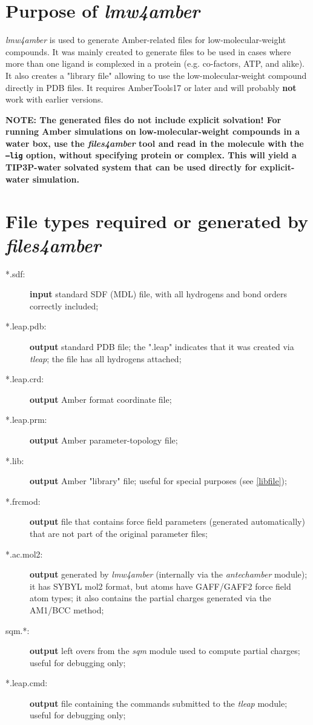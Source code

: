 \documentclass[10pt,landscape,twocolumn]{article}
\begin{document}
\section{Purpose of \textbf{\textsl{lmw4amber}}}
\textsl{lmw4amber} is used to generate Amber-related files for low-molecular-weight compounds. It was mainly created to generate files to be used in cases where more than one ligand is complexed in a protein (e.g. co-factors, ATP, and alike). It also creates a "library file" allowing to use the low-molecular-weight compound directly in PDB files. It requires AmberTools17 or later and will probably \textbf{not} work with earlier versions. 

\begin{mdframed}
\textbf{NOTE: The generated files do not include explicit solvation! For running Amber simulations on low-molecular-weight compounds in a water box, use the \textsl{files4amber} tool and read in the molecule with the \texttt{--lig} option, without specifying protein or complex. This will yield a TIP3P-water solvated system that can be used directly for explicit-water simulation.}
\end{mdframed}
\section{File types required or generated by \textsl{files4amber}}

\begin{description}
\item[*.sdf:] \textbf{input} standard SDF (MDL) file, with all hydrogens and bond orders correctly included; 
\item[*.leap.pdb:] \textbf{output} standard PDB file; the ".leap" indicates that it was created via \textsl{tleap}; the file has all hydrogens attached;
\item[*.leap.crd:] \textbf{output} Amber format coordinate file;
\item[*.leap.prm:] \textbf{output} Amber parameter-topology file;
\item[*.lib:] \textbf{output} Amber "library" file; useful for special purposes (see \ref{libfile});
\item[*.frcmod:] \textbf{output} file that contains force field parameters (generated automatically) that are not part of the original parameter files;
\item[*.ac.mol2:] \textbf{output} generated by \textsl{lmw4amber} (internally via the \textsl{antechamber} module); it has SYBYL mol2 format, but atoms have GAFF/GAFF2 force field atom types; it also contains the partial charges generated via the AM1/BCC method;
\item[sqm.*:] \textbf{output} left overs from the \textsl{sqm} module used to compute partial charges; useful for debugging only;
\item[*.leap.cmd:] \textbf{output} file containing the commands submitted to the \textsl{tleap} module; useful for debugging only;
\end{description}
\end{document}
